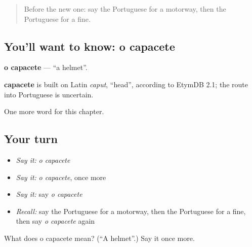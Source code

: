 \label{lesson:PT-C249-capacete}



\begin{quote}
Before the new one: say the Portuguese for a motorway, then the Portuguese for a fine.
\end{quote}

\subsection*{You'll want to know: o capacete}
\textbf{o capacete} — \textquotedblleft{}a helmet\textquotedblright{}.

\begin{cousinweb}
\textbf{capacete} is built on Latin \emph{caput}, \textquotedblleft{}head\textquotedblright{}, according to EtymDB 2.1; the route into Portuguese is uncertain.
\end{cousinweb}

\begin{grammarlens}[title={What you've built}]
One more word for this chapter.
\end{grammarlens}

\subsection*{Your turn}
\begin{itemize}
\raggedright
  \item \emph{Say it:} \emph{o capacete}
  \item \emph{Say it:} \emph{o capacete}, once more
  \item \emph{Say it:} say \emph{o capacete}
  \item \emph{Recall:} say the Portuguese for a motorway, then the Portuguese for a fine, then say \emph{o capacete} again
\end{itemize}

\begin{tcolorbox}[breakable,colback=teal!4,colframe=teal!35!black,title={Before you move on}]
What does o capacete mean? (\textquotedblleft{}A helmet\textquotedblright{}.) Say it once more.
\end{tcolorbox}
